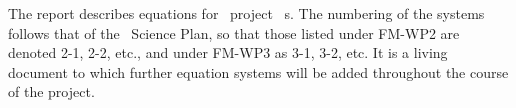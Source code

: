 The report describes equations for \exc \ project \nep \ \Papp s.  
The numbering of the systems follows that of the \nep\ Science Plan, so 
that those listed under FM-WP2 are denoted 2-1, 2-2, etc., and 
under FM-WP3 as 3-1, 3-2, etc. It is a living document to which further equation 
systems will be added throughout the course of the project.

